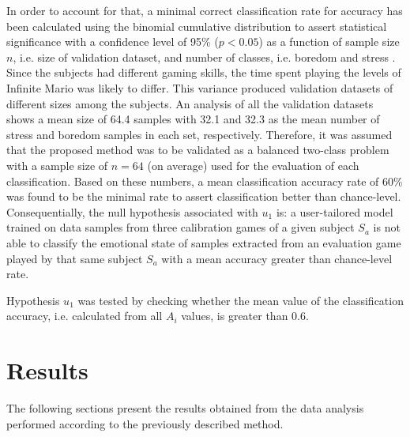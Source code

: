 In order to account for that, a minimal correct classification rate for accuracy has been calculated using the binomial cumulative distribution to assert statistical significance with a confidence level of 95\% ($p < 0.05$) as a function of sample size $n$, i.e. size of validation dataset, and number of classes, i.e. boredom and stress \parencite{combrisson2015exceeding}. Since the subjects had different gaming skills, the time spent playing the levels of Infinite Mario was likely to differ. This variance produced validation datasets of different sizes among the subjects. An analysis of all the validation datasets shows a mean size of 64.4 samples with 32.1 and 32.3 as the mean number of stress and boredom samples in each set, respectively. Therefore, it was assumed that the proposed method was to be validated as a balanced two-class problem with a sample size of $n=64$ (on average) used for the evaluation of each classification. Based on these numbers, a mean classification accuracy rate of 60\% was found to be the minimal rate to assert classification better than chance-level. Consequentially, the null hypothesis associated with $u_1$ is: a user-tailored model trained on data samples from three calibration games of a given subject $S_a$ is not able to classify the emotional state of samples extracted from an evaluation game played by that same subject $S_a$ with a mean accuracy greater than chance-level rate.

Hypothesis $u_1$ was tested by checking whether the mean value of the classification accuracy, i.e. calculated from all $A_i$ values, is greater than 0.6.


\section{Results}
\label{sec:experiment2-results}

The following sections present the results obtained from the data analysis performed according to the previously described method.

